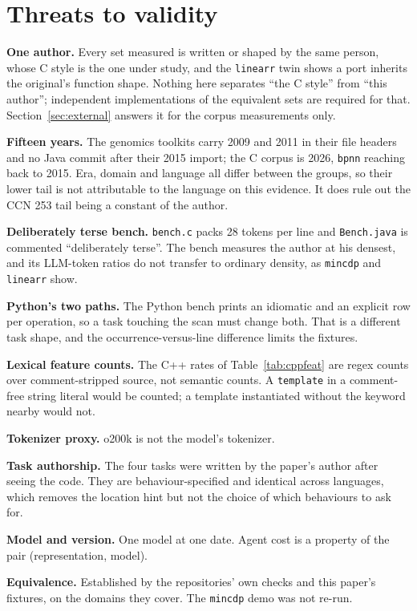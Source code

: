 \documentclass[11pt,a4paper]{article}
\begin{document}
\section{Threats to validity}

\textbf{One author.} Every set measured is written or shaped by the same person, whose C style is the one under study, and the \texttt{linearr} twin shows a port inherits the original's function shape. Nothing here separates ``the C style'' from ``this author''; independent implementations of the equivalent sets are required for that. Section~\ref{sec:external} answers it for the corpus measurements only.

\textbf{Fifteen years.} The genomics toolkits carry 2009 and 2011 in their file headers and no Java commit after their 2015 import; the C corpus is 2026, \texttt{bpnn} reaching back to 2015. Era, domain and language all differ between the groups, so their lower tail is not attributable to the language on this evidence. It does rule out the CCN 253 tail being a constant of the author.

\textbf{Deliberately terse bench.} \texttt{bench.c} packs 28 tokens per line and \texttt{Bench.java} is commented ``deliberately terse''. The bench measures the author at his densest, and its LLM-token ratios do not transfer to ordinary density, as \texttt{mincdp} and \texttt{linearr} show.

\textbf{Python's two paths.} The Python bench prints an idiomatic and an explicit row per operation, so a task touching the scan must change both. That is a different task shape, and the occurrence-versus-line difference limits the fixtures.

\textbf{Lexical feature counts.} The C++ rates of Table~\ref{tab:cppfeat} are regex counts over comment-stripped source, not semantic counts. A \texttt{template} in a comment-free string literal would be counted; a template instantiated without the keyword nearby would not.

\textbf{Tokenizer proxy.} o200k is not the model's tokenizer.

\textbf{Task authorship.} The four tasks were written by the paper's author after seeing the code. They are behaviour-specified and identical across languages, which removes the location hint but not the choice of which behaviours to ask for.

\textbf{Model and version.} One model at one date. Agent cost is a property of the pair (representation, model).

\textbf{Equivalence.} Established by the repositories' own checks and this paper's fixtures, on the domains they cover. The \texttt{mincdp} demo was not re-run.
\end{document}
